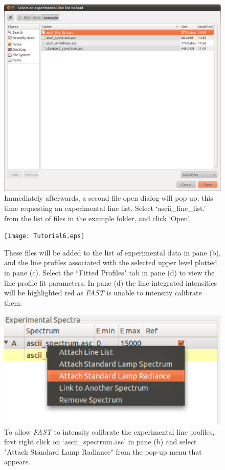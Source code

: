 \documentclass[a4paper,12pt]{report}
\newcommand{\fast}{\emph{FAST} }
\begin{document}
\begin{figure}\centering
\includegraphics[width=140mm]{Tutorial5.eps}
\caption{Immediately afterwards, a second file open dialog will pop-up; this time requesting an experimental line list. Select `ascii\_line\_list.' from the list of files in the example folder, and click `Open'.}
\label{fig:tut5}
\end{figure}

\begin{figure}\centering
\texttt{[image: Tutorial6.eps]}
\caption{These files will be added to the list of experimental data in pane (b), and the line profiles associated with the selected upper level plotted in pane (c). Select the ``Fitted Profiles" tab in pane (d) to view the line profile fit parameters. In pane (d) the line integrated intensities will be highlighted red as \fast is unable to intensity calibrate them.}
\label{fig:tut6}
\end{figure}

\begin{figure}\centering
\includegraphics[scale=0.5]{Tutorial7.eps}
\caption{To allow \fast to intensity calibrate the experimental line profiles, first right click on `ascii\_spectrum.asc' in pane (b) and select "Attach Standard Lamp Radiance" from the pop-up menu that appears.}
\label{fig:tut7}
\end{figure}
\end{document}

